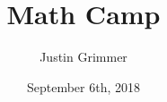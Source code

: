\documentclass{beamer}
\title[Methodology I] %
{Math Camp}
\author{Justin Grimmer}
\institute[Stanford University]{Professor\\Department of Political Science \\  Stanford University}
\date{September 6th, 2018}
\newtheorem{thm}{Theorem}
\numberwithin{equation}{section}
\begin{document}
\begin{frame}
\titlepage
\end{frame}












\end{document}
